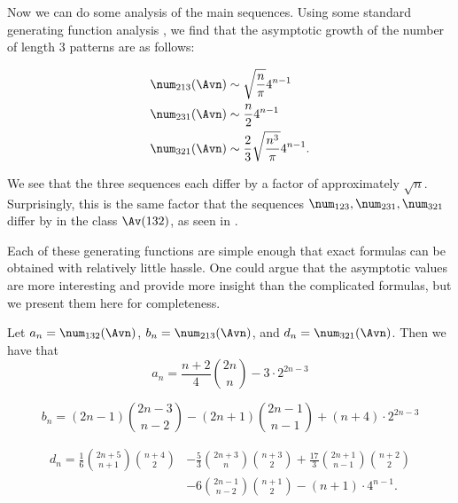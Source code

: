\documentclass[12pt,twoside]{memoir}
\begin{document}
    Now we can do some analysis of the main sequences. Using some
    standard generating function analysis \cite{flajolet}, we find
    that the asymptotic growth of the number of length $3$ patterns are
    as follows:

    \vspace{1pc}

    $$ \begin{aligned}
     \num_{213} (\Avn) &\sim \sqrt{\frac{n}{\pi}} 4^{n-1} \\
     \num_{231} (\Avn) &\sim \frac{n}{2} 4^{n-1}  \\
     \num_{321} (\Avn) &\sim \frac{2}{3} \sqrt{\frac{n^3}{\pi}} 4^{n-1}. 
    \end{aligned} $$

    We see that the three sequences each differ by a factor of
    approximately $\sqrt{n}$. Surprisingly, this is the same factor that
    the sequences $\num_{123}, \num_{231}, \num_{321}$ differ by in the
    class $\Av (132)$, as seen in \cite{Bona2012}.

    Each of these generating functions are simple enough that exact
    formulas can be obtained with relatively little hassle. One could
    argue that the asymptotic values are more interesting and
    provide more insight than the complicated formulas, but we present
    them here for completeness.

    \begin{corollary}
      Let $a_n = \num_{132}(\Avn)$, $b_n = \num_{213}(\Avn)$, and $d_n =
      \num_{321}(\Avn)$. Then we have that
      $$ a_n = \frac{n+2}{4} \binom{2n}{n} - 3 \cdot 2^{2n-3} $$

      \vspace{1pc}

      $$ b_n = (2n-1) \binom{2n-3}{n-2} - (2n+1)\binom{2n-1}{n-1} +
         (n+4) \cdot 2^{2n-3}$$
      
      \vspace{1pc}

      $$ \begin{aligned} d_n
          = \frac{1}{6} \binom{2n+5}{n+1} \binom{n+4}{2}
          &- \frac{5}{3} \binom{2n+3}{n} \binom{n+3}{2}
          + \frac{17}{3} \binom{2n+1}{n-1} \binom{n+2}{2} \\
          &- 6\binom{2n-1}{n-2} \binom{n+1}{2} - (n+1) \cdot 4^{n-1}.
        \end{aligned}
      $$
    \end{corollary}

   
\end{document}
